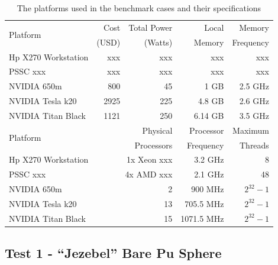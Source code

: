 \documentclass[preprint,12pt]{elsarticle}
\begin{document}
\begin{table}[h]
\centering
\caption{The platforms used in the benchmark cases and their specifications}
\label{platform_table}
\small
\begin{tabular}{| l | r | r | r | r |}
\hline
\multirow{2}{*}{Platform} &  Cost   &Total Power  & Local       & Memory     \\
                                       & (USD)  &(Watts) & Memory  & Frequency \\
\hline
Hp X270 Workstation     &    xxx    & xxx &  xxx         &  xxx                      \\
\hline
PSSC xxx                      &    xxx   & xxx &  xxx        &  xxx                    \\
\hline
NVIDIA 650m                &    800   & 45 &  1 GB        &  2.5 GHz                 \\
\hline
NVIDIA Tesla k20         &    2925     & 225 &  4.8  GB      &  2.6 GHz                  \\
\hline
NVIDIA Titan Black       &     1121   & 250 &  6.14 GB        & 3.5 GHz              \\
\hline
\hline
\hline
\multirow{2}{*}{Platform}  &  \multicolumn{2}{r|}{Physical }     & Processor  & Maximum \\
                                        & \multicolumn{2}{r|}{Processors}  & Frequency  & Threads \\
\hline
Hp X270 Workstation      &  \multicolumn{2}{r|}{1x Xeon xxx}  &  3.2 GHz     &  8           \\
\hline
PSSC xxx                      &   \multicolumn{2}{r|}{4x AMD xxx }  &  2.1 GHz     &  48           \\
\hline
NVIDIA 650m                &     \multicolumn{2}{r|}{2}   &   900 MHz    &  $2^{32}-1$           \\
\hline
NVIDIA Tesla k20         &       \multicolumn{2}{r|}{13}   &  705.5 MHz     &  $2^{32}-1$           \\
\hline
NVIDIA Titan Black       &      \multicolumn{2}{r|}{ 15 }  &  1071.5 MHz     & $2^{32}-1$           \\
\hline

\end{tabular}
\end{table}


\subsection{Test 1 - ``Jezebel'' Bare Pu Sphere}
\end{document}
